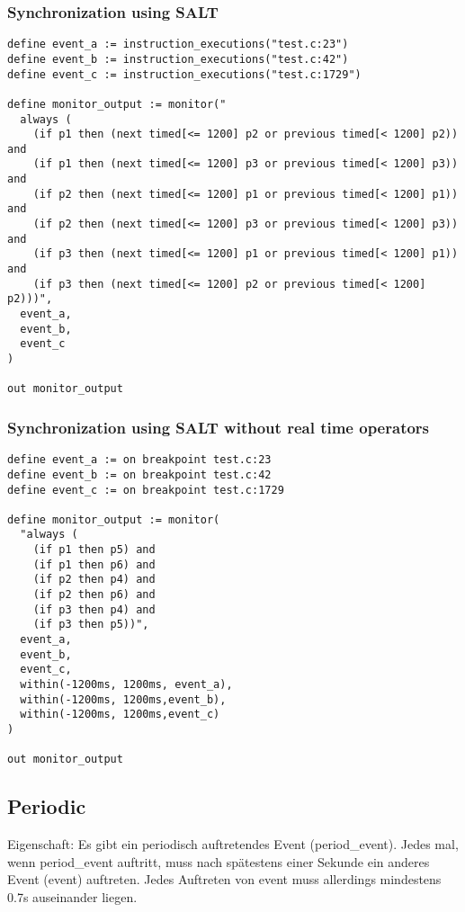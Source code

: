 \subsubsection{Synchronization using SALT}

\begin{lstlisting}
define event_a := instruction_executions("test.c:23")
define event_b := instruction_executions("test.c:42")
define event_c := instruction_executions("test.c:1729")

define monitor_output := monitor("
  always (
    (if p1 then (next timed[<= 1200] p2 or previous timed[< 1200] p2)) and
    (if p1 then (next timed[<= 1200] p3 or previous timed[< 1200] p3)) and
    (if p2 then (next timed[<= 1200] p1 or previous timed[< 1200] p1)) and
    (if p2 then (next timed[<= 1200] p3 or previous timed[< 1200] p3)) and
    (if p3 then (next timed[<= 1200] p1 or previous timed[< 1200] p1)) and
    (if p3 then (next timed[<= 1200] p2 or previous timed[< 1200] p2)))", 
  event_a, 
  event_b, 
  event_c
)

out monitor_output
\end{lstlisting}

\subsubsection{Synchronization using SALT without real time operators}

\begin{lstlisting}
define event_a := on breakpoint test.c:23
define event_b := on breakpoint test.c:42
define event_c := on breakpoint test.c:1729

define monitor_output := monitor(
  "always (
    (if p1 then p5) and
    (if p1 then p6) and
    (if p2 then p4) and
    (if p2 then p6) and
    (if p3 then p4) and
    (if p3 then p5))",
  event_a,
  event_b,
  event_c,
  within(-1200ms, 1200ms, event_a),
  within(-1200ms, 1200ms,event_b),
  within(-1200ms, 1200ms,event_c)
)

out monitor_output
\end{lstlisting}

\subsection{Periodic}

Eigenschaft: Es gibt ein periodisch auftretendes Event (period\_event). Jedes mal, wenn period\_event auftritt, 
muss nach spätestens einer Sekunde ein anderes Event (event) auftreten. Jedes Auftreten von event muss 
allerdings mindestens 0.7s auseinander liegen.

